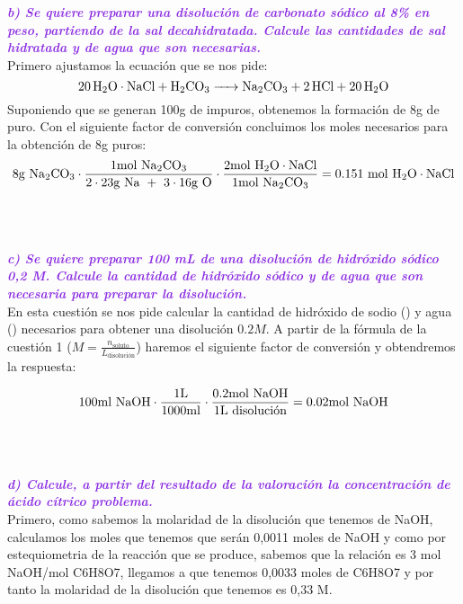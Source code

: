 \clearpage

\noindent\textcolor{BlueViolet}{\textbf{\textit{b) Se quiere preparar una disolución de carbonato sódico al 8\% en peso, partiendo de la sal decahidratada. Calcule las cantidades de sal hidratada y de agua que son necesarias.}}}\\

\noindent Primero ajustamos la ecuación que se nos pide:
\[\ce{20H2O\cdot NaCl + H2CO3 -> Na2CO3 + 2HCl + 20H2O}\]
\noindent Suponiendo que se generan 100\si{g} de  impuros, obtenemos la formación de 8\si{g} de  puro. Con el siguiente factor de conversión concluimos los moles necesarios para la obtención de 8g puros:
\[ 8\si{g}\ \ce{Na2CO3} \cdot \frac{1\ce{mol}\ \ce{Na2CO3}}{2\cdot23\si{g}\ \ce{Na}\ +\ 3\cdot16\si{g}\ \ce{O}} \cdot \frac{2\si{mol}\ \ce{H2O}\cdot\ce{NaCl}}{1\si{mol}\ \ce{Na2CO3}} = 0.151\ \si{mol}\ \ce{H2O}\cdot\ce{NaCl}\]\\\\\\
\noindent\textcolor{BlueViolet}{\textbf{\textit{c) Se quiere preparar 100 mL de una disolución de hidróxido sódico 0,2 M. Calcule la cantidad de hidróxido sódico y de agua que son necesaria para preparar la disolución.}}}\\

\noindent En esta cuestión se nos pide calcular la cantidad de hidróxido de sodio () y agua () necesarios para obtener una disolución $0.2 M$. A partir de la fórmula de la cuestión 1 ($M = \frac{n_{\text{soluto}}}{\si{L}_{\text{disolución}}}$) haremos el siguiente factor de conversión y obtendremos la respuesta:

\[100\si{ml} \ \ce{NaOH} \cdot \frac{1\si{L}}{1000\si{ml}} \cdot \frac{0.2 \si{mol} \ \ce{NaOH}}{1 \si{L}\ \text{disolución}} = 0.02 \si{mol} \ \ce{NaOH}\]\\\\\\
\noindent\textcolor{BlueViolet}{\textbf{\textit{d) Calcule, a partir del resultado de la valoración la concentración de ácido cítrico problema.}}}\\

\noindent Primero, como sabemos la molaridad de la disolución que tenemos de NaOH,
calculamos los moles que tenemos que serán 0,0011 moles de NaOH y como por
estequiometria de la reacción que se produce, sabemos que la relación es 3 mol
NaOH/mol C6H8O7, llegamos a que tenemos 0,0033 moles de C6H8O7 y por tanto la
molaridad de la disolución que tenemos es 0,33 M.